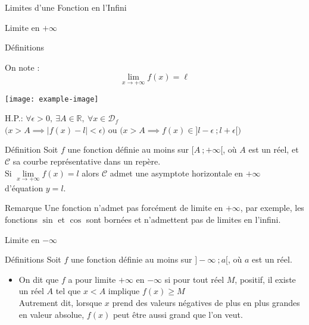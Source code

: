 \documentclass{cours}
\begin{document}
\begin{Gpartie}{Limites d'une Fonction en l'Infini}
\begin{Spartie}{Limite en $+\infty$}
\begin{SSpartie}{Définitions}
\begin{itemize}
                    On note : \[\lim\limits_{x\to +\infty}f(x)=\ell\]
                    \begin{center}
                            \texttt{[image: example-image]}
                        \parbox{\linewidth}{}
                    \end{center}
                    \vspace*{2ex}
                    H.P.: $\forall\epsilon >0,~\exists A\in\mathbb{R},~\forall x\in\mathcal{D}_f$ \\ \phantom{H.P.: }$\bigg(x>A\implies\left\lvert f(x)-l\right\rvert <\epsilon\bigg)$ ou $\bigg(x>A\implies f(x)\in\big]l-\epsilon~;l+\epsilon\big[\bigg)$
                \end{itemize}
            \end{SSpartie}
            \begin{SSpartie}{Définition} 
                Soit $f$ une fonction définie au moins sur $\big[A~;+\infty\big[$, où $A$ est un réel, et $\mathcal{C}$ sa courbe représentative dans un repère. \\ Si $\lim\limits_{x\to+\infty}f(x)=l$ alors $\mathcal{C}$ admet une asymptote horizontale en $+\infty$ \\ d'équation $y=l$.
            \end{SSpartie}
            \begin{SSpartie}{Remarque} 
                Une fonction n'admet pas forcément de limite en $+\infty$, par exemple, les fonctions $\sin$ et $\cos$ sont bornées et n'admettent pas de limites en l'infini.
            \end{SSpartie}
        \end{Spartie}
        \begin{Spartie}{Limite en $-\infty$} 
            \begin{SSpartie}{Définitions}
                Soit $f$ une fonction définie au moins sur $\big]-\infty~;a\big[$, où $a$ est un réel.
                \begin{itemize}
                    \item   On dit que $f$ a pour limite $+\infty$ en $-\infty$ si pour tout réel $M$, positif, il existe un réel $A$ tel que $x<A$ implique $f(x)\geq M$ \\ Autrement dit, lorsque $x$ prend des valeurs négatives de plus en plus grandes en valeur absolue, $f(x)$ peut être aussi grand que l'on veut.
                    

\end{itemize}
\end{SSpartie}
\end{Spartie}
\end{Gpartie}
\end{document}
